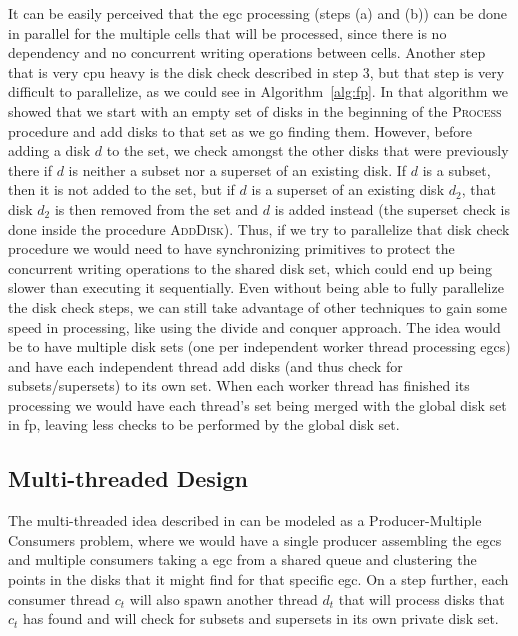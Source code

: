 It can be easily perceived that the \ac{egc} processing (steps (a) and (b)) can be done in parallel for the multiple
cells that will be processed, since there is no dependency and no concurrent writing operations between cells. Another
step that is very \ac{cpu} heavy is the disk check described in step 3, but that step is very difficult to parallelize,
as we could see in Algorithm~\ref{alg:fp}. In that algorithm we showed that we start with an empty set of disks in the
beginning of the \textsc{Process} procedure and add disks to that set as we go finding them. However, before adding a
disk $d$ to the set, we check amongst the other disks that were previously there if $d$ is neither a subset nor a
superset of an existing disk. If $d$ is a subset, then it is not added to the set, but if $d$ is a superset of an
existing disk $d_2$, that disk $d_2$ is then removed from the set and $d$ is added instead (the superset check is done
inside the procedure \textsc{AddDisk}). Thus, if we try to parallelize that disk check procedure we would need to have
synchronizing primitives to protect the concurrent writing operations to the shared disk set, which could end up being
slower than executing it sequentially. Even without being able to fully parallelize the disk check steps, we can still
take advantage of other techniques to gain some speed in processing, like using the divide and conquer approach. The
idea would be to have multiple disk sets (one per independent worker thread processing \acp{egc}) and have each
independent thread add disks (and thus check for subsets/supersets) to its own set. When each worker thread has finished
its processing we would have each thread's set being merged with the global disk set in \ac{fp}, leaving less checks to
be performed by the global disk set.

\subsection{Multi-threaded Design}
\label{subsec:multithread}
The multi-threaded idea described in  can be modeled as a Producer-Multiple Consumers problem,
where we would have a single producer assembling the \ac{egc}s and multiple consumers taking a \ac{egc} from a shared
queue and clustering the points in the disks that it might find for that specific \ac{egc}. On a step further, each
consumer thread $c_t$ will also spawn another thread $d_t$ that will process disks that $c_t$ has found and will check
for subsets and supersets in its own private disk set.

